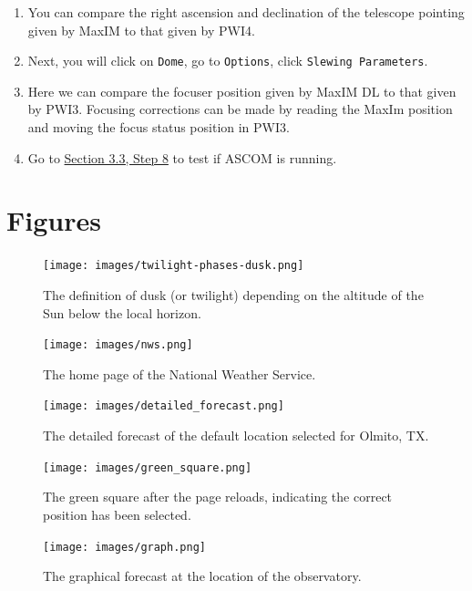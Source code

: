 \documentclass{article}
\begin{document}
\begin{enumerate}
		\item You can compare the right ascension and declination of the telescope pointing given by MaxIM to that given by PWI4. 
		
		\item Next, you will click on \texttt{Dome}, go to \texttt{Options}, click \texttt{Slewing Parameters}.
		
		\item Here we can compare the focuser position given by MaxIM DL to that given by PWI3. Focusing corrections can be made by reading the MaxIm position and moving the focus status position in PWI3.
		
		\item Go to \hyperref[sec:take-test-exposure]{Section 3.3, Step 8} to test if ASCOM is running. 
		
	\end{enumerate}	
	
	\newpage
	\section{Figures}
	\label{sec:figures}
	
	\begin{figure}[htbp!]
		\centering
		\texttt{[image: images/twilight-phases-dusk.png]}
		\caption{The definition of dusk (or twilight) depending on the altitude of the Sun below the local horizon.}
		\label{fig:twilight}
	\end{figure}

	\begin{figure}[htbp!]
		\centering
		\texttt{[image: images/nws.png]}
		\caption{The home page of the National Weather Service.}
		\label{fig:nws}
	\end{figure}

	\begin{figure}[htbp!]
		\centering
		\texttt{[image: images/detailed\_forecast.png]}
		\caption{The detailed forecast of the default location selected for Olmito, TX.}
		\label{fig:forecast}
	\end{figure}

	\begin{figure}[htbp!]
		\centering
		\texttt{[image: images/green\_square.png]}
		\caption{The green square after the page reloads, indicating the correct position has been selected.}
		\label{fig:position}
	\end{figure}

	\begin{figure}[htbp!]
		\centering
		\texttt{[image: images/graph.png]}
		\caption{The graphical forecast at the location of the observatory.}
		\label{fig:graphical}
	\end{figure}
\end{document}
